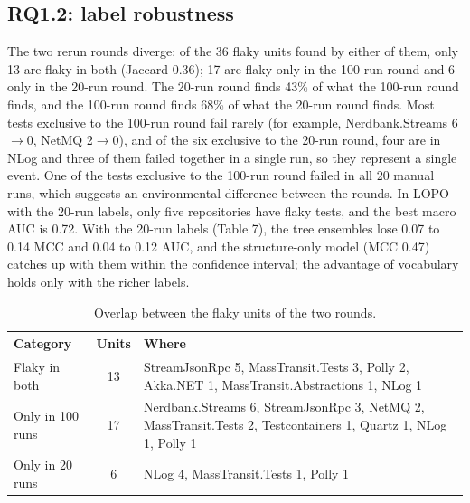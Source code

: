 \subsection{RQ1.2: label robustness}
The two rerun rounds diverge: of the 36 flaky units found by either of them, only 13 are flaky in both (Jaccard 0.36); 17 are flaky only in the 100-run round and 6 only in the 20-run round. The 20-run round finds 43\% of what the 100-run round finds, and the 100-run round finds 68\% of what the 20-run round finds. Most tests exclusive to the 100-run round fail rarely (for example, Nerdbank.Streams 6$\to$0, NetMQ 2$\to$0), and of the six exclusive to the 20-run round, four are in NLog and three of them failed together in a single run, so they represent a single event. One of the tests exclusive to the 100-run round failed in all 20 manual runs, which suggests an environmental difference between the rounds. In LOPO with the 20-run labels, only five repositories have flaky tests, and the best macro AUC is 0.72. With the 20-run labels (Table 7), the tree ensembles lose 0.07 to 0.14 MCC and 0.04 to 0.12 AUC, and the structure-only model (MCC 0.47) catches up with them within the confidence interval; the advantage of vocabulary holds only with the richer labels.

\begin{table}[!h]
\caption{Overlap between the flaky units of the two rounds.}
\label{tab:sobreposicao}
\centering
\footnotesize
\begin{tabular}{@{}lcp{}@{}}
\hline\hline
\textbf{Category} & \textbf{Units} & \textbf{Where} \tabularnewline
\hline
Flaky in both & 13 & \raggedright StreamJsonRpc 5, MassTransit.Tests 3, Polly 2, Akka.NET 1, MassTransit.Abstractions 1, NLog 1 \tabularnewline[2pt]
Only in 100 runs & 17 & \raggedright Nerdbank.Streams 6, StreamJsonRpc 3, NetMQ 2, MassTransit.Tests 2, Testcontainers 1, Quartz 1, NLog 1, Polly 1 \tabularnewline[2pt]
Only in 20 runs & 6 & \raggedright NLog 4, MassTransit.Tests 1, Polly 1 \tabularnewline
\hline\hline
\end{tabular}
\end{table}

